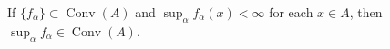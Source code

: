 If $\{f_\alpha\} \subset \operatorname{Conv}(A)$ and $\sup_\alpha f_\alpha(x) < \infty$ for each $x \in A$, then $\sup_\alpha f_\alpha \in \operatorname{Conv}(A)$.
